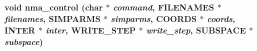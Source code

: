 \subsubsection{\setlength{\rightskip}{0pt plus 5cm}void nma\_\-control (char $\ast$ {\em command}, {\bf FILENAMES} $\ast$ {\em filenames}, {\bf SIMPARMS} $\ast$ {\em simparms}, {\bf COORDS} $\ast$ {\em coords}, {\bf INTER} $\ast$ {\em inter}, {\bf WRITE\_\-STEP} $\ast$ {\em write\_\-step}, {\bf SUBSPACE} $\ast$ {\em subspace})}\label{nma__cntr_8c_26627d7fc23d7444158d78a1f4e7a0bc}


